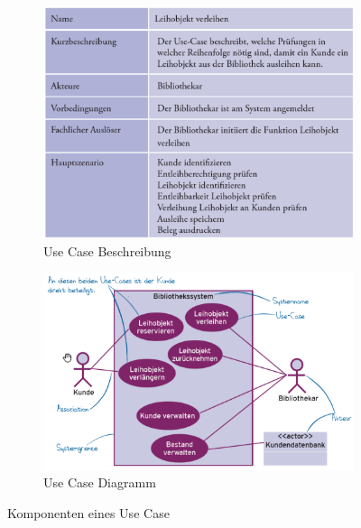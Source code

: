 \documentclass[a4paper]{article}
\begin{document}
			\begin{figure}[!htb]
				\centering
				\begin{subfigure}{.45\textwidth}
					\centering
					\includegraphics[width=\textwidth]{img/re/03/usecase.png}
					\caption{Use Case Beschreibung}
					\label{fig:re_usecase_desc}
				\end{subfigure}
				\begin{subfigure}{.45\textwidth}
					\centering
					\includegraphics[width=\textwidth]{img/re/03/usecase_dia.png}
					\caption{Use Case Diagramm}
					\label{fig:re_usecase_dia}
				\end{subfigure}
				\caption{Komponenten eines Use Case}
				\label{fig:re_usecase}
			\end{figure}
\end{document}
